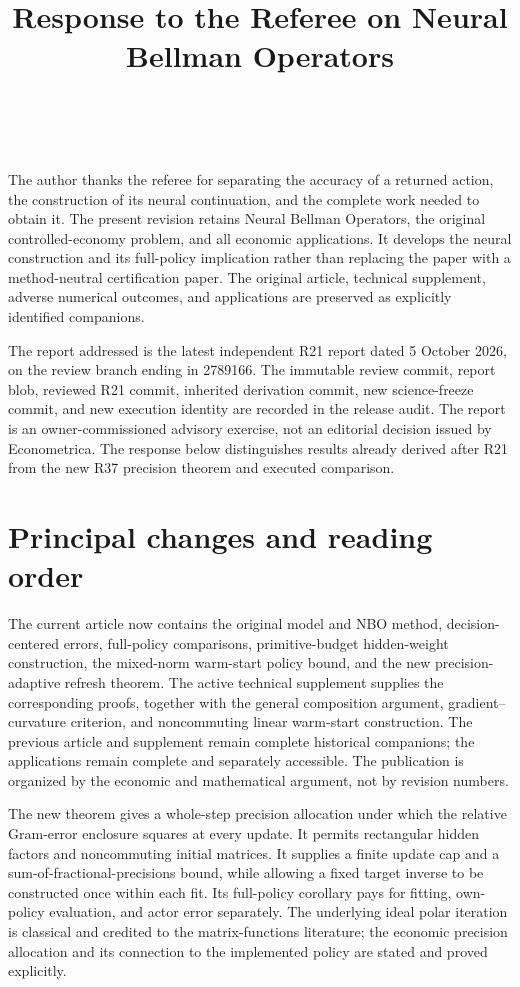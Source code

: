 \documentclass[ecta,nameyear,draft]{econsocart}
\theoremstyle{definition}
\theoremstyle{remark}
\begin{document}
\begin{frontmatter}
\title{Response to the Referee on Neural Bellman Operators}
\begin{aug}
\author[id=au1,addressref={add1}]{~}
\address[id=add1]{Peking University}
\end{aug}
\end{frontmatter}
The author thanks the referee for separating the accuracy of a returned action, the construction of its neural continuation, and the complete work needed to obtain it. The present revision retains Neural Bellman Operators, the original controlled-economy problem, and all economic applications. It develops the neural construction and its full-policy implication rather than replacing the paper with a method-neutral certification paper. The original article, technical supplement, adverse numerical outcomes, and applications are preserved as explicitly identified companions.

The report addressed is the latest independent R21 report dated 5 October 2026, on the review branch ending in 2789166. The immutable review commit, report blob, reviewed R21 commit, inherited derivation commit, new science-freeze commit, and new execution identity are recorded in the release audit. The report is an owner-commissioned advisory exercise, not an editorial decision issued by Econometrica. The response below distinguishes results already derived after R21 from the new R37 precision theorem and executed comparison.

\section*{Principal changes and reading order}

The current article now contains the original model and NBO method, decision-centered errors, full-policy comparisons, primitive-budget hidden-weight construction, the mixed-norm warm-start policy bound, and the new precision-adaptive refresh theorem. The active technical supplement supplies the corresponding proofs, together with the general composition argument, gradient--curvature criterion, and noncommuting linear warm-start construction. The previous article and supplement remain complete historical companions; the applications remain complete and separately accessible. The publication is organized by the economic and mathematical argument, not by revision numbers.

The new theorem gives a whole-step precision allocation under which the relative Gram-error enclosure squares at every update. It permits rectangular hidden factors and noncommuting initial matrices. It supplies a finite update cap and a sum-of-fractional-precisions bound, while allowing a fixed target inverse to be constructed once within each fit. Its full-policy corollary pays for fitting, own-policy evaluation, and actor error separately. The underlying ideal polar iteration is classical and credited to the matrix-functions literature; the economic precision allocation and its connection to the implemented policy are stated and proved explicitly.
\end{document}
